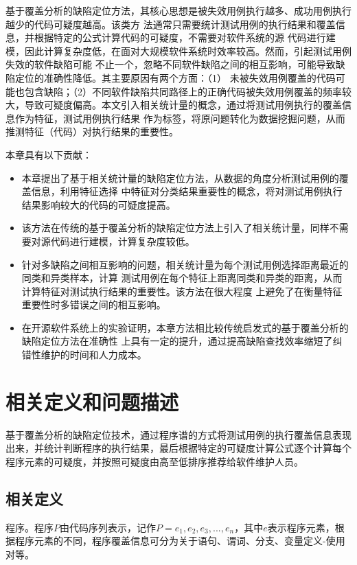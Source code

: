 基于覆盖分析的缺陷定位方法，其核心思想是被失效用例执行越多、成功用例执行越少的代码可疑度越高。该类方
法通常只需要统计测试用例的执行结果和覆盖信息，并根据特定的公式计算代码的可疑度，不需要对软件系统的源
代码进行建模，因此计算复杂度低，在面对大规模软件系统时效率较高。然而，引起测试用例失效的软件缺陷可能
不止一个，忽略不同软件缺陷之间的相互影响，可能导致缺陷定位的准确性降低。其主要原因有两个方面：（1）
未被失效用例覆盖的代码可能也包含缺陷；（2）不同软件缺陷共同路径上的正确代码被失效用例覆盖的频率较
大，导致可疑度偏高。本文引入相关统计量的概念，通过将测试用例执行的覆盖信息作为特征，测试用例执行结果
作为标签，将原问题转化为数据挖掘问题，从而推测特征（代码）对执行结果的重要性。

本章具有以下贡献：
\begin{itemize}
      \item 本章提出了基于相关统计量的缺陷定位方法，从数据的角度分析测试用例的覆盖信息，利用特征选择
中特征对分类结果重要性的概念，将对测试用例执行结果影响较大的代码的可疑度提高。
      \item 该方法在传统的基于覆盖分析的缺陷定位方法上引入了相关统计量，同样不需要对源代码进行建模，计算复杂度较低。
      \item 针对多缺陷之间相互影响的问题，相关统计量为每个测试用例选择距离最近的同类和异类样本，计算
      测试用例在每个特征上距离同类和异类的距离，从而计算特征对测试执行结果的重要性。该方法在很大程度
      上避免了在衡量特征重要性时多错误之间的相互影响。
      \item 在开源软件系统上的实验证明，本章方法相比较传统启发式的基于覆盖分析的缺陷定位方法在准确性
      上具有一定的提升，通过提高缺陷查找效率缩短了纠错性维护的时间和人力成本。
\end{itemize}

\section{相关定义和问题描述}
基于覆盖分析的缺陷定位技术，通过程序谱的方式将测试用例的执行覆盖信息表现出来，并统计判断程序的执行结果，最后根据特定的可疑度计算公式逐个计算每个程序元素的可疑度，并按照可疑度由高至低排序推荐给软件维护人员。

\subsection{相关定义}
\begin{Definition}
      程序。程序$P$由代码序列表示，记作$P={e_1, e_2, e_3, ..., e_n}$，其中$e$表示程序元素，根据程序元素的不同，程序覆盖信息可分为关于语句、谓词、分支、变量定义-使用对等。
\end{Definition}

